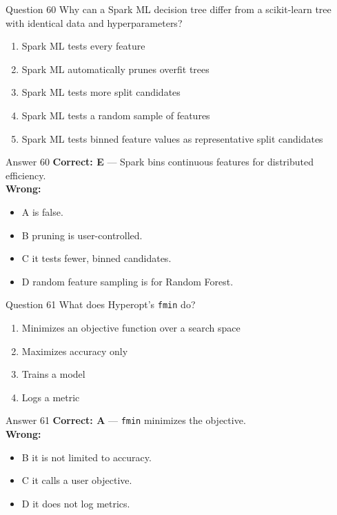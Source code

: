 \documentclass[aspectratio=169,11pt]{beamer}
\begin{document}
	\begin{frame}{Question 60}
		Why can a Spark ML decision tree differ from a scikit-learn tree with identical data and hyperparameters?
		\begin{enumerate}[label=\Alph*.]
			\item Spark ML tests every feature
			\item Spark ML automatically prunes overfit trees
			\item Spark ML tests more split candidates
			\item Spark ML tests a random sample of features
			\item Spark ML tests binned feature values as representative split candidates
		\end{enumerate}
	\end{frame}
	\begin{frame}{Answer 60}
		\textbf{Correct: E} --- Spark bins continuous features for distributed efficiency.\\
		\vspace{0.5em}
		\textbf{Wrong:}
		\begin{itemize}
			\item A is false.
			\item B pruning is user-controlled.
			\item C it tests fewer, binned candidates.
			\item D random feature sampling is for Random Forest.
		\end{itemize}
	\end{frame}
	
	\begin{frame}{Question 61}
		What does Hyperopt's \texttt{fmin} do?
		\begin{enumerate}[label=\Alph*.]
			\item Minimizes an objective function over a search space
			\item Maximizes accuracy only
			\item Trains a model
			\item Logs a metric
		\end{enumerate}
	\end{frame}
	\begin{frame}{Answer 61}
		\textbf{Correct: A} --- \texttt{fmin} minimizes the objective.\\
		\vspace{0.5em}
		\textbf{Wrong:}
		\begin{itemize}
			\item B it is not limited to accuracy.
			\item C it calls a user objective.
			\item D it does not log metrics.
		\end{itemize}
	\end{frame}
	
\end{document}
